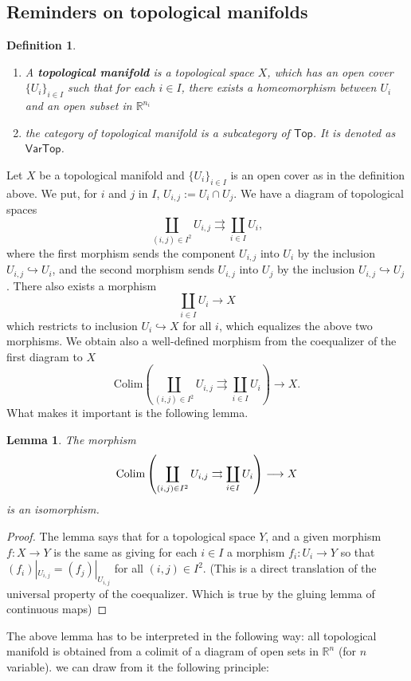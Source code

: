 \documentclass{tufte-book} %
\numberwithin{dummy}{section}
\newtheorem{lemma}[thm]{Lemma}
\newtheorem{dfn}[thm]{Definition}
\newcommand{\reals}{\mathbb R}
\newcommand{\lrta}{\longrightarrow}
\newcommand{\inj}{\hookrightarrow}
\begin{document}
\subsection*{Reminders on topological manifolds}
\begin{dfn}
\begin{enumerate}
  \item A \textbf{topological manifold} is a topological space $X$, which has an open cover $\{U_i\}_{i\in I}$ such that for each $i\in I$, there exists a homeomorphism between $U_i$ and an open subset in $\reals^{n_i}$ 

  \item the category of topological manifold is a subcategory of $\mathsf{Top}$. It is denoted as $\mathsf{VarTop}$. 
\end{enumerate}
\end{dfn}

Let $X$ be a topological manifold and $\{U_i\}_{i\in I}$ is an open cover as in the definition above. We put, for $i$ and $j$ in $I$, $U_{i,j}:=U_i\cap U_j$. We have a diagram of topological spaces
$$
\coprod_{(i,j)\in I^2}U_{i,j}\rightrightarrows \coprod_{i\in I} U_{i},
$$
where the first morphism sends the component $U_{i,j}$ into $U_i$ by the inclusion $U_{i,j}\inj U_i$, and the second morphism sends $U_{i,j}$ into $U_j$ by the inclusion $U_{i,j}\inj U_j$. There also exists  a morphism
$$
\coprod_{i\in I} U_i\lrta X
$$
which restricts to inclusion $U_i\inj X$ for all $i$, which equalizes the above two morphisms. We obtain also a well-defined morphism from the coequalizer of the first diagram to $X$
$$
\text{Colim}\left(\coprod_{(i,j)\in I^2}U_{i,j}\rightrightarrows \coprod_{i\in I}U_i\right)\lrta X.
$$
What makes it important is the following lemma.
\begin{lemma}
The morphism 
$$
\textnormal{Colim}\left(\coprod_{(i,j)\in I^2}U_{i,j}\rightrightarrows \coprod_{i\in I}U_i\right)\lrta X
$$
is an isomorphism.
\end{lemma}
\begin{proof}
The lemma says that for a topological space $Y$, and a given morphism $f:X\lrta Y$ is the same as giving for each $i\in I$ a morphism $f_i:U_i\lrta Y$ so that $(f_i)|_{U_{i,j}}=(f_j)|_{U_{i,j}}$ for all $(i,j)\in I^2$. (This is a direct translation of the universal property of the coequalizer. Which is true by the gluing lemma of continuous maps)
\end{proof}
The above lemma has to be interpreted in the following way: all topological manifold is obtained from a colimit of a diagram of open sets in $\reals^n$ (for $n$ variable). we can draw from it the following principle:
\end{document}
